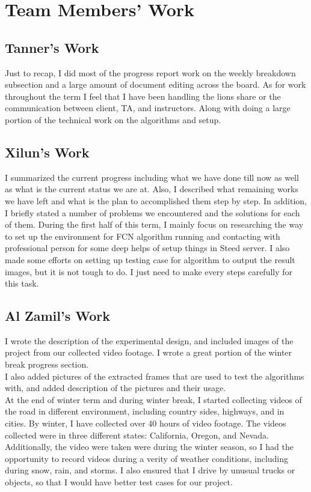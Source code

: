 \documentclass[10pt,draftclsnofoot,onecolumn,journal,compsoc]{IEEEtran}
\begin{document}
\section{Team Members' Work}
\subsection{Tanner's Work}
Just to recap, I did most of the progress report work on the weekly breakdown subsection and a large amount of document editing across the board.
As for work throughout the term I feel that I have been handling the lions share or the communication between client, TA, and instructors. Along with doing a large portion of the technical work on the algorithms and setup. 

\subsection{Xilun's Work}
I summarized the current progress including what we have done till now as well as what is the current status we are at. Also, I described what remaining works we have left and what is the plan to accomplished them step by step. 
In addition, I briefly stated a number of problems we encountered and the solutions for each of them.
During the first half of this term, I mainly focus on researching the way to set up the environment for FCN algorithm running and contacting with professional person for some deep helps of setup things in Steed server. 
I also made some efforts on setting up testing case for algorithm to output the result images, but it is not tough to do. 
I just need to make every steps carefully for this task. 

\subsection{Al Zamil's Work}
I wrote the description of the experimental design, and included images of the project from our collected video footage. I wrote a great portion of the winter break progress section.\\
I also added pictures of the extracted frames that are used to test the algorithms with, and added description of the pictures and their usage. \\
At the end of winter term and during winter break, I started collecting videos of the road in different environment, including country sides, highways, and in cities. 
By winter, I have collected over 40 hours of video footage. The videos collected were in three different states: California, Oregon, and Nevada. 
Additionally, the video were taken were during the winter season, so I had the opportunity to record videos during a verity of weather conditions, including during snow, rain, and storms. 
I also ensured that I drive by unusual trucks or objects, so that I would have better test cases for our project.
\end{document}
